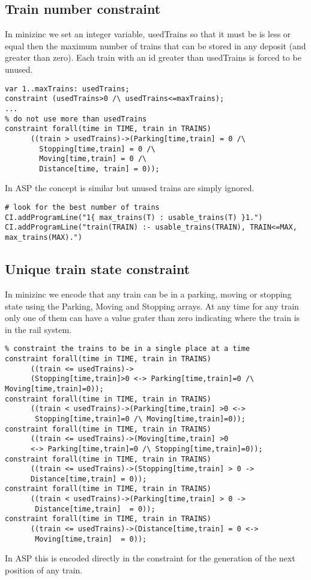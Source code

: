 \documentclass[11pt]{article}
\begin{document}
\subsection{Train number constraint}
In minizinc we set an integer variable, usedTrains so that it must be 
is less or equal then the maximum number of trains that can
be stored in any deposit (and greater than zero).
Each train with an id greater than usedTrains is forced 
to be unused.
\begin{verbatim}
var 1..maxTrains: usedTrains;
constraint (usedTrains>0 /\ usedTrains<=maxTrains);
...
% do not use more than usedTrains 
constraint forall(time in TIME, train in TRAINS)
      ((train > usedTrains)->(Parking[time,train] = 0 /\
        Stopping[time,train] = 0 /\
        Moving[time,train] = 0 /\ 
        Distance[time, train] = 0));
\end{verbatim}
In ASP the concept is similar but unused trains are simply ignored.
\begin{verbatim}
# look for the best number of trains
CI.addProgramLine("1{ max_trains(T) : usable_trains(T) }1.")
CI.addProgramLine("train(TRAIN) :- usable_trains(TRAIN), TRAIN<=MAX, max_trains(MAX).")
\end{verbatim}
\subsection{Unique train state constraint}
In minizinc we encode that any train can be in a parking, moving or stopping state using
the Parking, Moving and Stopping arrays. At any time for any train only one of them
can have a value grater than zero indicating where the train is in the rail system.
\begin{verbatim}
% constraint the trains to be in a single place at a time
constraint forall(time in TIME, train in TRAINS)
      ((train <= usedTrains)->
      (Stopping[time,train]>0 <-> Parking[time,train]=0 /\ Moving[time,train]=0));
constraint forall(time in TIME, train in TRAINS)
      ((train < usedTrains)->(Parking[time,train] >0 <->
       Stopping[time,train]=0 /\ Moving[time,train]=0));
constraint forall(time in TIME, train in TRAINS)
      ((train <= usedTrains)->(Moving[time,train] >0 
      <-> Parking[time,train]=0 /\ Stopping[time,train]=0));
constraint forall(time in TIME, train in TRAINS)
      ((train <= usedTrains)->(Stopping[time,train] > 0 -> 
      Distance[time,train] = 0));
constraint forall(time in TIME, train in TRAINS)
      ((train < usedTrains)->(Parking[time,train] > 0 ->
       Distance[time,train]  = 0));
constraint forall(time in TIME, train in TRAINS)
      ((train <= usedTrains)->(Distance[time,train] = 0 <->
       Moving[time,train]  = 0));     
\end{verbatim}
In ASP this is encoded directly in the constraint for the generation of the next
position of any train.
\end{document}
